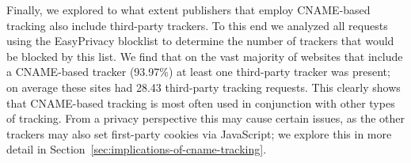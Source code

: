 Finally, we explored to what extent publishers that employ CNAME-based tracking also include third-party trackers.
To this end we analyzed all requests using the EasyPrivacy blocklist \cite{easyprivacy} to determine the number of trackers that would be blocked by this list.
We find that on the vast majority of websites that include a CNAME-based tracker (93.97\%) at least one third-party tracker was present; on average these sites had 28.43 third-party tracking requests.
This clearly shows that CNAME-based tracking is most often used in conjunction with other types of tracking.
From a privacy perspective this may cause certain issues, as the other trackers may also set first-party cookies via JavaScript; we explore this in more detail in Section~\ref{sec:implications-of-cname-tracking}.
